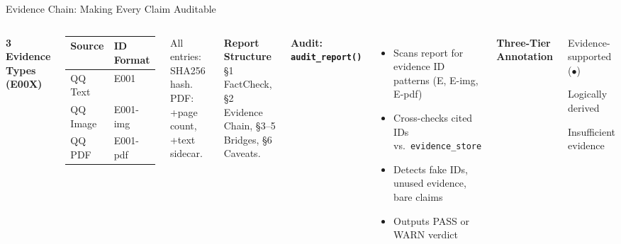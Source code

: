 \documentclass[aspectratio=169,11pt]{beamer}
\begin{document}
\begin{frame}{Evidence Chain: Making Every Claim Auditable}
  \begin{columns}[T]
    \textbf{3 Evidence Types (E00X)}
    \begin{table}[h]
      \footnotesize
      \begin{tabular}{ll}
        \toprule
        Source & ID Format \\
        \midrule
        QQ Text & E001 \\
        QQ Image & E001-img \\
        QQ PDF & E001-pdf \\
        \bottomrule
      \end{tabular}
    \end{table}
    {\scriptsize All entries: SHA256 hash. PDF: +page count, +text sidecar.}

    \vspace{0.05cm}
    \textbf{Report Structure}
    {\scriptsize §1 FactCheck, §2 Evidence Chain, §3--5 Bridges, §6 Caveats.}

    \textbf{Audit: \texttt{audit\_report()}}
    \begin{itemize}
      \footnotesize
      \item Scans report for evidence ID patterns (E, E-img, E-pdf)
      \item Cross-checks cited IDs vs.\ \texttt{evidence\_store}
      \item Detects fake IDs, unused evidence, bare claims
      \item Outputs PASS or WARN verdict
    \end{itemize}

    \vspace{0.1cm}
    \textbf{Three-Tier Annotation}
    \begin{description}
      \footnotesize
      \item[\texttt{[E001]}] Evidence-supported (\textcolor{greenRYG}{$\bullet$})
      \item[Inferred] Logically derived
      \item[Needs Verif.] Insufficient evidence
    \end{description}
  \end{columns}
\end{frame}
\end{document}
